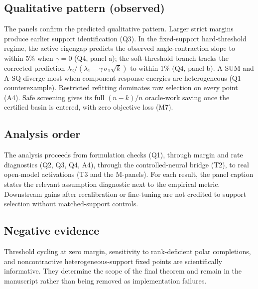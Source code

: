 \subsection{Qualitative pattern (observed)}
The panels confirm the predicted qualitative pattern. Larger strict margins produce earlier support identification (Q3). In the fixed-support hard-threshold regime, the active eigengap predicts the observed angle-contraction slope to within $5\%$ when $\gamma{=}0$ (Q4, panel a); the soft-threshold branch tracks the corrected prediction $\lambda_2 / (\lambda_1 - \gamma\,\sigma_1\sqrt{k})$ to within $1\%$ (Q4, panel b). A-SUM and A-SQ diverge most when component response energies are heterogeneous (Q1 counterexample). Restricted refitting dominates raw selection on every point (A4). Safe screening gives its full $(n-k)/n$ oracle-work saving once the certified basin is entered, with zero objective loss (M7).

\subsection{Analysis order}
The analysis proceeds from formulation checks (Q1), through margin and rate diagnostics (Q2, Q3, Q4, A4), through the controlled-neural bridge (T2), to real open-model activations (T3 and the M-panels). For each result, the panel caption states the relevant assumption diagnostic next to the empirical metric. Downstream gains after recalibration or fine-tuning are not credited to support selection without matched-support controls.

\subsection{Negative evidence}
Threshold cycling at zero margin, sensitivity to rank-deficient polar completions, and noncontractive heterogeneous-support fixed points are scientifically informative. They determine the scope of the final theorem and remain in the manuscript rather than being removed as implementation failures.
